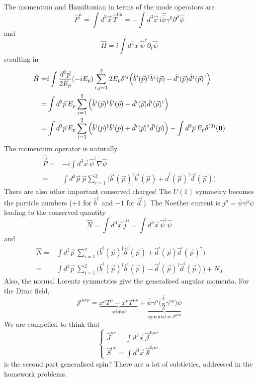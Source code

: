 \begin{defi}
The momentum and Hamiltonian in terms of the mode operators are
\[\hat{P}^{\mu }=\int d^3\vec{x}\,\hat{T}^{0\mu }=-\int d^3\vec{x}\,i\hat{\bar{\psi }}\gamma ^{0}\partial ^{\mu }\hat{\psi }\]
and
\[\hat{H}=i\int d^3\vec{x}\,\hat{\psi }^{\dagger}\partial _{t}\hat{\psi }\]
resulting in
\[\begin{align*}
\hat{H}=&i\int \dfrac{d^3\vec{p}}{2E_{p}}(-iE_{p})\sum _{i,j=1}^{2}2E_{p}\delta ^{ij}\Big(\hat{b}^{i}(\vec{p})^{\dagger}\hat{b}^{j}(\vec{p})-\hat{d}^{i}(\vec{p})\hat{d}^{j}(\vec{p})^{\dagger}\Big)\\
=&\int d^3\vec{p}\,E_{p}\sum ^{2}_{i=1}\Big(\hat{b}^{i}(\vec{p})^{\dagger}\hat{b}^{i}(\vec{p})-\hat{d}^{i}(\vec{p})\hat{d}^{i}(\vec{p})^{\dagger}\Big)\\
=&\int d^3\vec{p}\,E_{p}\sum ^{2}_{i=1}\Big(\hat{b}^{i}(\vec{p})^{\dagger}\hat{b}^{i}(\vec{p})+\hat{d}^{i}(\vec{p})^{\dagger}\hat{d}^{i}(\vec{p})\Big)-\int d^3\vec{p}\,E_{p}\delta ^{(3)}({\bf 0})
\end{align*}\]
The momentum operator is naturally 
\[\begin{align*}
\hat{\vec{P}}=&-i\int d^3\vec{x}\,\hat{\psi }^{\dagger}\nabla \hat{\psi }\\
=&\int d^3\vec{p}\,\vec{p}\sum ^{2}_{i=1}\Big(\hat{b}^{i}(\vec{p})^{\dagger}\hat{b}^{i}(\vec{p})+\hat{d}^{i}(\vec{p})^{\dagger}\hat{d}^{i}(\vec{p})\Big)
\end{align*}\]
There are also other important conserved charges! The $U(1)$ symmetry becomes the particle numbers ($+1$ for $\hat{b}^{\dagger}$ and $-1$ for $\hat{d}^{\dagger}$). The Noether current is $j^{\mu }=\bar{\psi }\gamma ^{\mu }\psi $ leading to the conserved quantity
\[\hat{N}=\int d^3\vec{x}\,\hat{j}^{0}=\int d^3\vec{x}\,\hat{\psi }^{\dagger}\hat{\psi }\]
and
\[\begin{align*}
\hat{N}=&\int d^3\vec{p}\,\sum ^{2}_{i=1}\Big(\hat{b}^{i}(\vec{p})^{\dagger}\hat{b}^{i}(\vec{p})+\hat{d}^{i}(\vec{p})\hat{d}^{i}(\vec{p})^{\dagger}\Big)\\
=&\int d^3\vec{p}\,\sum ^{2}_{i=1}\Big(\hat{b}^{i}(\vec{p})^{\dagger}\hat{b}^{i}(\vec{p})-\hat{d}^{i}(\vec{p})^{\dagger}\hat{d}^{i}(\vec{p})\Big)+N_0
\end{align*}\]
Also, the normal Lorentz symmetries give the generalised angular momenta. For the Dirac field, 
\[\mathcal{J}^{\mu \nu \rho }=\underbrace{x^{\rho }T^{\mu }-x^{\nu }T^{\mu \rho }}_{\mathrm{orbital}}+\underbrace{\bar{\psi }\gamma ^{\mu }\Big(\dfrac{i}{2}\gamma ^{\nu \rho }\Big)\psi}_{\mathrm{spinorial}=\mathcal{S}^{\mu \nu \rho }} \]
We are compelled to think that
\[\begin{cases}
\hat{J}^{\mu \nu }=\int d^3\vec{x}\,\hat{\mathcal{J}}^{0\mu \nu }\\
\hat{S}^{\mu \nu }=\int d^3\vec{x}\,\hat{\mathcal{S}}^{0\mu \nu }
\end{cases}\]
is the second part generalised spin? There are a lot of subtleties, addressed in the homework problems.
\end{defi}
